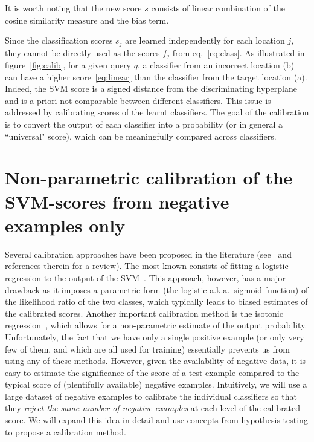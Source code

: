       \noindent
      It is worth noting that the new score $s$ consists of linear combination of the cosine similarity measure and the bias term.

   \vspace{5mm}   
   Since the classification scores $s_j$ are learned independently for each location $j$, they cannot be directly used as the scores $f_j$ from eq.~\eqref{eq:class}. As illustrated in figure~\ref{fig:calib}, for a given query $q$, a classifier from an incorrect location (b) can have a higher score~\eqref{eq:linear} than the classifier from the target location (a). Indeed, the SVM score is a signed distance from the discriminating hyperplane and is a priori not comparable between different classifiers. This issue is addressed by calibrating scores of the learnt classifiers. The goal of the calibration is to convert the output of each classifier into a probability (or in general a ``universal" score), which can be meaningfully compared across classifiers. 

    
\section{Non-parametric calibration of the  SVM-scores from negative examples only}
\label{sec:calibration}

   Several calibration approaches have been proposed in the literature (see~\cite{gebel2007calibrating} and references therein for a review). The most known consists of fitting a logistic regression to the output of the SVM~\cite{Platt99}.  This approach, however, has a major drawback as it imposes a parametric form (the logistic a.k.a.\ sigmoid function) of the likelihood ratio of the two classes, which typically leads to biased estimates of the calibrated scores. Another important calibration method is the isotonic regression~\cite{zadrozny2002transforming}, which allows for a non-parametric estimate of the output probability.
   Unfortunately, the fact that we have only a single positive example \sout{(or only very few of them, and which are all used for training)} essentially prevents us from using any of these methods. 
   However, given the availability of negative data, it is easy to estimate the significance of the score of a test example compared to the typical score of (plentifully available) negative examples. Intuitively, we will use a large dataset of negative examples to calibrate the individual classifiers so that they {\em reject the same number of negative examples} at each level of the calibrated score.
   We will expand this idea in detail and use concepts from hypothesis testing to propose a calibration method.
